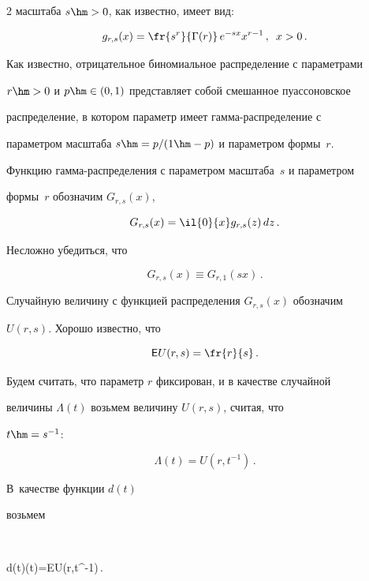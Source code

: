 \begin{multicols}{2}
масштаба $s\hm>0$, как известно, имеет вид:


$$


g_{r,s}(x)=\fr{s^r}{\Gamma(r)}\,e^{-s x}x^{r-1}\,,\enskip x>0\,.


$$


Как известно, отрицательное биномиальное распределение с параметрами


$r\hm>0$ и $p\hm\in(0,1)$ представ\-ля\-ет собой смешанное пуассоновское


распределение, в котором параметр имеет гам\-ма-рас\-пре\-де\-ле\-ние с


параметром масштаба $s\hm=p/(1\hm-p)$ и параметром формы~$r$.





Функцию гамма-распределения с параметром масштаба~$s$ и параметром


формы~$r$ обозначим $G_{r,s}(x)$,


$$


G_{r,s}(x)=\il{0}{x}g_{r,s}(z)\,dz\,.


$$


Несложно убедиться, что


\begin{equation}


G_{r,s}(x)\equiv G_{r,1}(s x)\,.


\label{e5-dul}


\end{equation}


Случайную величину с функцией распределения $G_{r,s}(x)$ обозначим


$U(r,s)$. Хорошо известно, что 


$$


{\sf E}U(r,s)=\fr{r}{s}\,.


$$





Будем считать, что параметр $r$ фиксирован, и в качестве случайной


величины $\Lambda(t)$ возьмем величину $U(r,s)$, считая, что


$t\hm=s^{-1}$: 


$$


\Lambda(t)=U(r,t^{-1})\,.


$$ 


В~качестве функции $d(t)$


возьмем 


$$


d(t)\Lambda(t)={\sf E}U(r,t^{-1})\,.



\end{multicols}
